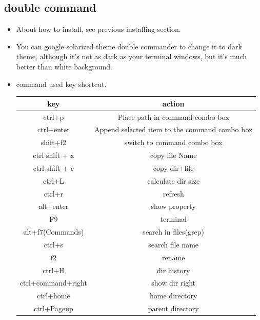 \documentclass[a4paper,12pt,twoside]{book}
\begin{document}
\subsection{double command}
\begin{itemize}
		\item About how to install, see previous installing section.

		\item You can google solarized theme double commander to change it to dark theme, although it's not as dark as your terminal windows, but it's much better than white background. 

		\item command used key shortcut.\\

\begin{tabular}{|c|c|}
\hline 
\textbf{key} & \textbf{action} \\ 
\hline 
ctrl+p & Place path in command combo box   \\ 
\hline 
ctrl+enter  & Append selected item to the command combo box \\ 
\hline 
shift+f2  & switch to command combo box \\ 

\hline 
ctrl shift + x & copy file Name \\ 
\hline 
ctrl shift + c & copy dir+file \\ 

\hline \hline  
ctrl+L & calculate dir size  \\ 
\hline 
ctrl+r & refresh  \\ 
\hline 
alt+enter & show property \\ 

\hline 
F9 & terminal  \\ 

\hline 
 alt+f7(Commands) & search in files(grep) \\ 
\hline 
ctrl+s  & search file name \\ 
\hline 
f2  & rename \\ 
\hline
ctrl+H  & dir history \\ 

\hline 
ctrl+command+right  & show dir right  \\ 
\hline 
ctrl+home  & home directory \\ 
\hline 
ctrl+Pageup  & parent directory  \\ 
\hline 
 
\end{tabular} 


\end{itemize}
\end{document}
